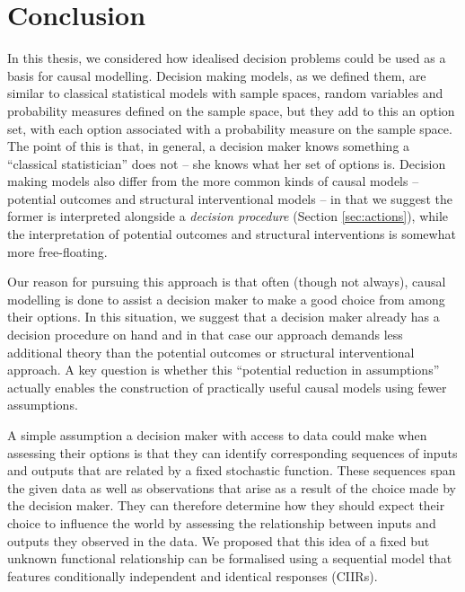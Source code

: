

\chapter{Conclusion}\label{ch:discussion}

In this thesis, we considered how idealised decision problems could be used as a basis for causal modelling. Decision making models, as we defined them, are similar to classical statistical models with sample spaces, random variables and probability measures defined on the sample space, but they add to this an option set, with each option associated with a probability measure on the sample space. The point of this is that, in general, a decision maker knows something a ``classical statistician'' does not -- she knows what her set of options is. Decision making models also differ from the more common kinds of causal models -- potential outcomes and structural interventional models -- in that we suggest the former is interpreted alongside a \emph{decision procedure} (Section \ref{sec:actions}), while the interpretation of potential outcomes and structural interventions is somewhat more free-floating.

Our reason for pursuing this approach is that often (though not always), causal modelling is done to assist a decision maker to make a good choice from among their options. In this situation, we suggest that a decision maker already has a decision procedure on hand and in that case our approach demands less additional theory than the potential outcomes or structural interventional approach. A key question is whether this ``potential reduction in assumptions'' actually enables the construction of practically useful causal models using fewer assumptions.

A simple assumption a decision maker with access to data could make when assessing their options is that they can identify corresponding sequences of inputs and outputs that are related by a fixed stochastic function. These sequences span the given data as well as observations that arise as a result of the choice made by the decision maker. They can therefore determine how they should expect their choice to influence the world by assessing the relationship between inputs and outputs they observed in the data.  We proposed that this idea of a fixed but unknown functional relationship can be formalised using a sequential model that features conditionally independent and identical responses (CIIRs).

